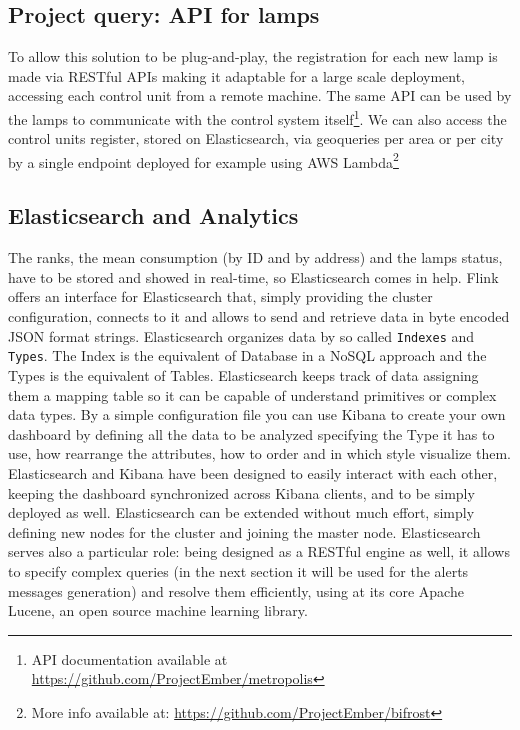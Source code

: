 \subsection*{Project query: API for lamps}
To allow this solution to be plug-and-play, the registration for each new lamp is made via RESTful APIs making it adaptable for a large scale deployment, accessing each control unit from a remote machine. The same API can be used by the lamps to communicate with the control system itself\footnote{API documentation available at \url{https://github.com/ProjectEmber/metropolis}}. We can also access the control units register, stored on Elasticsearch, via geoqueries per area or per city by a single endpoint deployed for example using AWS Lambda\footnote{More info available at: \url{https://github.com/ProjectEmber/bifrost}}

\subsection{Elasticsearch and Analytics}
The ranks, the mean consumption (by ID and by address) and the lamps status, have to be stored and showed in real-time, so Elasticsearch comes in help. Flink offers an interface for Elasticsearch that, simply providing the cluster configuration, connects to it and allows to send and retrieve data in byte encoded JSON format strings. Elasticsearch organizes data by so called \texttt{Indexes} and \texttt{Types}. The Index is the equivalent of Database in a NoSQL approach and the Types is the equivalent of Tables. Elasticsearch keeps track of data assigning them a mapping table so it can be capable of understand primitives or complex data types. By a simple configuration file you can use Kibana to create your own dashboard by defining all the data to be analyzed specifying the Type it has to use, how rearrange the attributes, how to order and in which style visualize them. Elasticsearch and Kibana have been designed to easily interact with each other, keeping the dashboard synchronized across Kibana clients, and to be simply deployed as well. Elasticsearch can be extended without much effort, simply defining new nodes for the cluster and joining the master node. Elasticsearch serves also a particular role: being designed as a RESTful engine as well, it allows to specify complex queries (in the next section it will be used for the alerts messages generation) and resolve them efficiently, using at its core Apache Lucene, an open source machine learning library.

